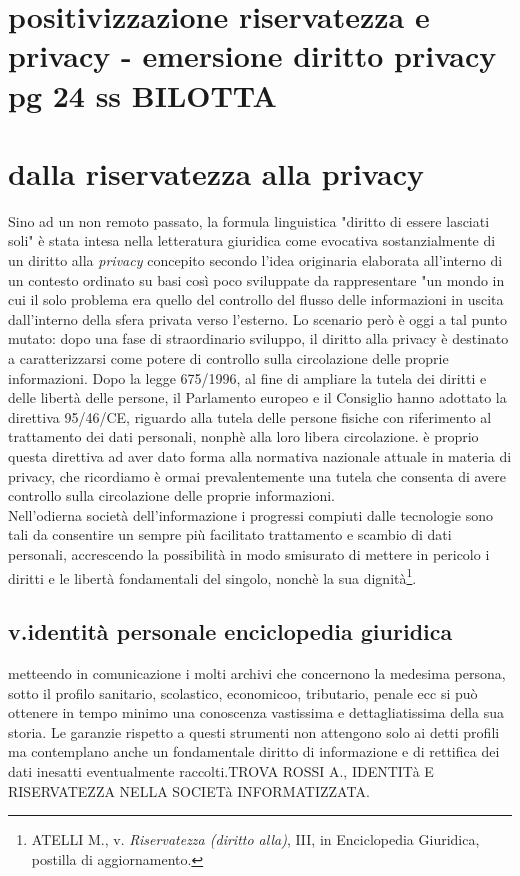 \section{positivizzazione riservatezza e privacy - emersione diritto privacy pg 24 ss BILOTTA}

\section{dalla riservatezza alla privacy}
Sino ad un non remoto passato, la formula linguistica "diritto di essere lasciati soli" è stata intesa nella letteratura giuridica come evocativa sostanzialmente di un diritto alla \textit{privacy} concepito secondo l'idea originaria elaborata all'interno di un contesto ordinato su basi così poco sviluppate da rappresentare "un mondo in cui il solo problema era quello del controllo del flusso delle informazioni in uscita dall'interno della sfera privata verso l'esterno.
Lo scenario però è oggi a tal punto mutato: dopo una fase di straordinario sviluppo, il diritto alla privacy è destinato a caratterizzarsi come potere di controllo sulla circolazione delle proprie informazioni.
Dopo la legge 675/1996, al fine di ampliare la tutela dei diritti e delle libertà delle persone, il Parlamento europeo e il Consiglio hanno adottato la direttiva 95/46/CE, riguardo alla tutela delle persone fisiche con riferimento al trattamento dei dati personali, nonphè alla loro libera circolazione.
è proprio questa direttiva ad aver dato forma alla normativa nazionale attuale in materia di privacy, che ricordiamo è ormai prevalentemente  una tutela che consenta di avere controllo sulla circolazione delle proprie informazioni.
\\Nell'odierna società dell'informazione i progressi compiuti dalle tecnologie sono tali da consentire un sempre più facilitato trattamento e scambio di dati personali, accrescendo la possibilità in modo smisurato di mettere in pericolo i diritti e le libertà fondamentali del singolo, nonchè la sua dignità\footnote{ATELLI M., v. \textit{Riservatezza (diritto alla)}, III, in Enciclopedia Giuridica, postilla di aggiornamento.}.

\subsection{v.identità personale enciclopedia giuridica}
metteendo in comunicazione i molti archivi che concernono la medesima persona, sotto il profilo sanitario, scolastico, economicoo, tributario, penale ecc si può ottenere in tempo minimo una conoscenza vastissima e dettagliatissima della sua storia. Le garanzie rispetto a questi strumenti non attengono solo ai detti profili ma contemplano anche un fondamentale diritto di informazione e di rettifica dei dati inesatti eventualmente raccolti.TROVA ROSSI A., IDENTITà E RISERVATEZZA NELLA SOCIETà INFORMATIZZATA.


